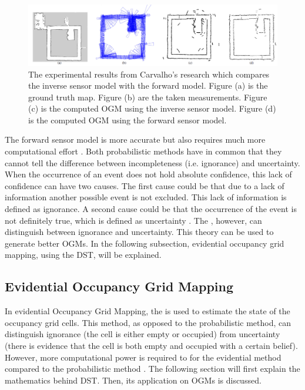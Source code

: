 \begin{figure}[h!]
	\centering
	\includegraphics[width=1\linewidth]{Figures/Occupancy_Grid_Map/OGM_inverse_forward_compare}
	\caption{The experimental results from Carvalho's research \cite{carvalho2013comparative} which compares the inverse sensor model with the forward model. Figure (a) is the ground truth map. Figure (b) are the taken measurements. Figure (c) is the computed \gls{OGM} using the inverse sensor model. Figure (d) is the computed \gls{OGM} using the forward sensor model.}
	\label{fig:OGM_inv_for_comp}
\end{figure}

The forward sensor model is more accurate but also requires much more computational effort \cite{carvalho2013comparative}. Both probabilistic methods have in common that they cannot tell the difference between incompleteness (i.e. ignorance) and uncertainty. When the occurrence of an event does not hold absolute confidence, this lack of confidence can have two causes. The first cause could be that due to a lack of information another possible event is not excluded. This lack of information is defined as ignorance. A second cause could be that the occurrence of the event is not definitely true, which is defined as uncertainty \cite{liu2001propositional}.
The  \cite{dempster1967upper} \cite{shafer1976mathematical}, however, can distinguish between ignorance and uncertainty. This theory can be used to generate better \glspl{OGM}. In the following subsection, evidential occupancy grid mapping, using the \gls{DST}, will be explained.


\subsection{Evidential Occupancy Grid Mapping} \label{subsec:evid_OGM}
In evidential Occupancy Grid Mapping, the  is used to estimate the state of the occupancy grid cells. This method, as opposed to the probabilistic method, can distinguish ignorance (the cell is either empty or occupied) from uncertainty (there is evidence that the cell is both empty and occupied with a certain belief). However, more computational power is required to for the evidential method compared to the probabilistic method \cite{moras2014evidential}. The following section will first explain the mathematics behind \gls{DST}. Then, its application on \glspl{OGM} is discussed. 


